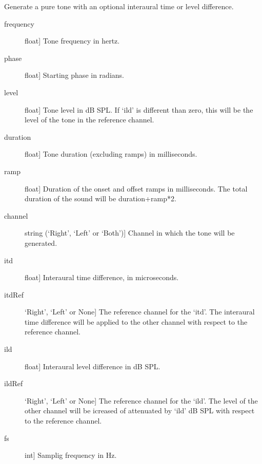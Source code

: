 \documentclass[letterpaper,10pt,english]{sphinxmanual}
\begin{document}

\begin{fulllineitems}
\label{index:sndlib.binauralPureTone}
Generate a pure tone with an optional interaural time or level difference.
\begin{description}
\item[{frequency}] \leavevmode{[}float{]}
Tone frequency in hertz.

\item[{phase}] \leavevmode{[}float{]}
Starting phase in radians.

\item[{level}] \leavevmode{[}float{]}
Tone level in dB SPL. If `ild' is different than zero, this will
be the level of the tone in the reference channel.

\item[{duration}] \leavevmode{[}float{]}
Tone duration (excluding ramps) in milliseconds.

\item[{ramp}] \leavevmode{[}float{]}
Duration of the onset and offset ramps in milliseconds.
The total duration of the sound will be duration+ramp*2.

\item[{channel}] \leavevmode{[}string (`Right', `Left' or `Both'){]}
Channel in which the tone will be generated.

\item[{itd}] \leavevmode{[}float{]}
Interaural time difference, in microseconds.

\item[{itdRef}] \leavevmode{[}`Right', `Left' or None{]}
The reference channel for the `itd'. The interaural time
difference will be applied to the other channel with
respect to the reference channel.

\item[{ild}] \leavevmode{[}float{]}
Interaural level difference in dB SPL.

\item[{ildRef}] \leavevmode{[}`Right', `Left' or None{]}
The reference channel for the `ild'.
The level of the other channel will be
icreased of attenuated by `ild' dB SPL
with respect to the reference channel.

\item[{fs}] \leavevmode{[}int{]}
Samplig frequency in Hz.


\end{description}
\end{fulllineitems}
\end{document}
